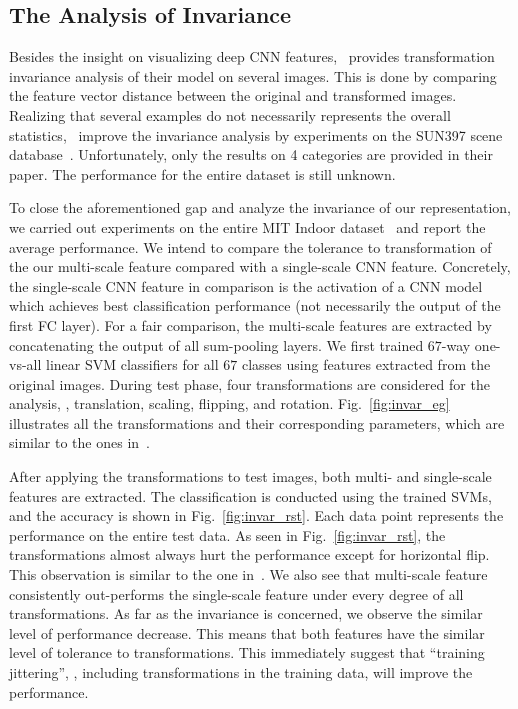 \documentclass[10pt,twocolumn,letterpaper]{article}
\begin{document}

\subsection{The Analysis of Invariance}

Besides the insight on visualizing deep CNN features,~\cite{visual_cnn} provides transformation invariance analysis of their model on several images. This is done by comparing the feature vector distance between the original and transformed images. Realizing that several examples do not necessarily represents the overall statistics,~\cite{Gong14} improve the invariance analysis by experiments on the SUN397 scene database~\cite{SUN397}. Unfortunately, only the results on 4 categories are provided in their paper. The performance for the entire dataset is still unknown.

To close the aforementioned gap and analyze the invariance of our representation, we carried out experiments on the entire MIT Indoor dataset~\cite{MIT67} and report the average performance. We intend to compare the tolerance to transformation of the our multi-scale feature compared with a single-scale CNN feature. Concretely, the single-scale CNN feature in comparison is the activation of a CNN model which achieves best classification performance (not necessarily the output of the first FC layer). For a fair comparison, the multi-scale features are extracted by concatenating the output of all sum-pooling layers. We first trained $67$-way one-vs-all linear SVM classifiers for all $67$ classes using features extracted from the original images. During test phase, four transformations are considered for the analysis, \ie, translation, scaling, flipping, and rotation. Fig.~\ref{fig:invar_eg} illustrates all the transformations and their corresponding parameters, which are similar to the ones in~\cite{Gong14}. 

After applying the transformations to test images, both multi- and single-scale features are extracted. The classification is conducted using the trained SVMs, and the accuracy is shown in Fig.~\ref{fig:invar_rst}. Each data point represents the performance on the entire test data. As seen in Fig.~\ref{fig:invar_rst}, the transformations almost always hurt the performance except for horizontal flip. This observation is similar to the one in~\cite{Gong14}. We also see that multi-scale feature consistently out-performs the single-scale feature under every degree of all transformations. As far as the invariance is concerned, we observe the similar level of performance decrease. This means that both features have the similar level of tolerance to transformations. This immediately suggest that ``training jittering'', \ie, including transformations in the training data, will improve the performance. 
\end{document}
